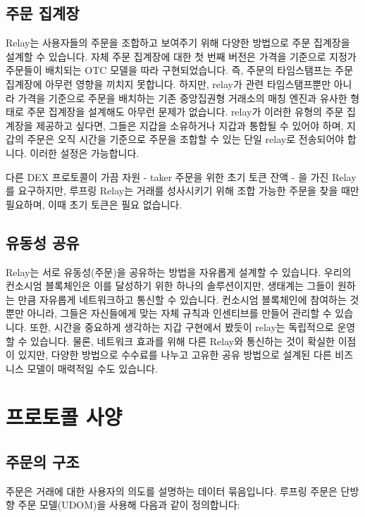 \documentclass[UTF8,nofonts]{article}
\begin{document}
\begin{multicols}{2}
\subsection{주문 집계장\label{sec:order_book}}
Relay는 사용자들의 주문을 조합하고 보여주기 위해 다양한 방법으로 주문 집계장을 설계할 수 있습니다. 자체 주문 집계장에 대한 첫 번째 버전은 가격을 기준으로 지정가 주문들이 배치되는 OTC 모델을 따라 구현되었습니다. 즉, 주문의 타임스탬프는 주문 집계장에 아무런 영향을 끼치지 못합니다. 하지만, relay가 관련 타임스탬프뿐만 아니라 가격을 기준으로 주문을 배치하는 기존 중앙집권형 거래소의 매칭 엔진과 유사한 형태로 주문 집계장을 설계해도 아무런 문제가 없습니다. relay가 이러한 유형의 주문 집계장을 제공하고 싶다면, 그들은 지갑을 소유하거나 지갑과 통합될 수 있어야 하며, 지갑의 주문은 오직 시간을 기준으로 주문을 조합할 수 있는 단일 relay로 전송되어야 합니다. 이러한 설정은 가능합니다.

다른 DEX 프로토콜이 가끔 자원 - taker 주문을 위한 초기 토큰 잔액 - 을 가진 Relay를 요구하지만, 루프링 Relay는 거래를 성사시키기 위해 조합 가능한 주문을 찾을 때만 필요하며, 이때 초기 토큰은 필요 없습니다.    

\subsection{유동성 공유\label{sec:liquidity_sharing}}
Relay는 서로 유동성(주문)을 공유하는 방법을 자유롭게 설계할 수 있습니다. 우리의 컨소시엄 블록체인은 이를 달성하기 위한 하나의 솔루션이지만, 생태계는 그들이 원하는 만큼 자유롭게 네트워크하고 통신할 수 있습니다. 컨소시엄 블록체인에 참여하는 것뿐만 아니라, 그들은 자신들에게 맞는 자체 규칙과 인센티브를 만들어 관리할 수 있습니다. 또한, 시간을 중요하게 생각하는 지갑 구현에서 봤듯이 relay는 독립적으로 운영할 수 있습니다. 물론, 네트워크 효과를 위해 다른 Relay와 통신하는 것이 확실한 이점이 있지만, 다양한 방법으로 수수료를 나누고 고유한 공유 방법으로 설계된 다른 비즈니스 모델이 매력적일 수도 있습니다.


\section{프로토콜 사양\label{sec:protocol}}

\subsection{주문의 구조\label{anatomy}}
주문은 거래에 대한 사용자의 의도를 설명하는 데이터 묶음입니다. 루프링 주문은 단방향 주문 모델(UDOM)을 사용해 다음과 같이 정의합니다: 


\end{multicols}
\end{document}
